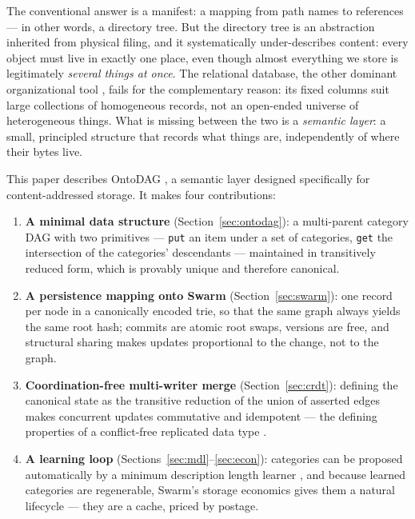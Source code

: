 \documentclass[10pt,twocolumn]{article}
\begin{document}
The conventional answer is a manifest: a mapping from path names to
references --- in other words, a directory tree. But the directory tree is
an abstraction inherited from physical filing, and it systematically
under-describes content: every object must live in exactly one place, even
though almost everything we store is legitimately \emph{several things at
once}. The relational database, the other dominant organizational tool
\cite{codd1970}, fails for the complementary reason: its fixed columns
suit large collections of homogeneous records, not an open-ended universe
of heterogeneous things. What is missing between the two is a
\emph{semantic layer}: a small, principled structure that records what
things are, independently of where their bytes live.

This paper describes OntoDAG \cite{ontodag}, a semantic layer designed
specifically for content-addressed storage. It makes four contributions:

\begin{enumerate}
  \item \textbf{A minimal data structure} (Section~\ref{sec:ontodag}): a
  multi-parent category DAG with two primitives ---
  \texttt{put} an item under a set of categories, \texttt{get} the
  intersection of the categories' descendants --- maintained in
  transitively reduced form, which is provably unique
  \cite{aho1972} and therefore canonical.
  \item \textbf{A persistence mapping onto Swarm}
  (Section~\ref{sec:swarm}): one record per node in a canonically encoded
  trie, so that the same graph always yields the same root hash; commits
  are atomic root swaps, versions are free, and structural sharing makes
  updates proportional to the change, not to the graph.
  \item \textbf{Coordination-free multi-writer merge}
  (Section~\ref{sec:crdt}): defining the canonical state as the transitive
  reduction of the union of asserted edges makes concurrent updates
  commutative and idempotent --- the defining properties of a
  conflict-free replicated data type \cite{shapiro2011}.
  \item \textbf{A learning loop} (Sections~\ref{sec:mdl}--\ref{sec:econ}):
  categories can be proposed automatically by a minimum description length
  learner \cite{mdlfca}, and because learned categories are regenerable,
  Swarm's storage economics gives them a natural lifecycle --- they are a
  cache, priced by postage.
\end{enumerate}
\end{document}
